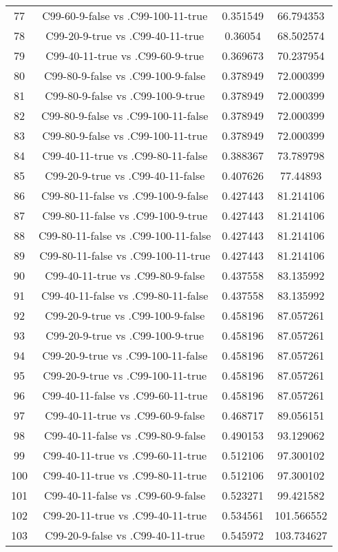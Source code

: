 \documentclass[a4paper,10pt]{article}
\begin{document}
\begin{landscape}
\begin{table}[!htp]
\begin{tabular}{cccc}
77&C99-60-9-false vs .C99-100-11-true&0.351549&66.794353\\
78&C99-20-9-true vs .C99-40-11-true&0.36054&68.502574\\
79&C99-40-11-true vs .C99-60-9-true&0.369673&70.237954\\
80&C99-80-9-false vs .C99-100-9-false&0.378949&72.000399\\
81&C99-80-9-false vs .C99-100-9-true&0.378949&72.000399\\
82&C99-80-9-false vs .C99-100-11-false&0.378949&72.000399\\
83&C99-80-9-false vs .C99-100-11-true&0.378949&72.000399\\
84&C99-40-11-true vs .C99-80-11-false&0.388367&73.789798\\
85&C99-20-9-true vs .C99-40-11-false&0.407626&77.44893\\
86&C99-80-11-false vs .C99-100-9-false&0.427443&81.214106\\
87&C99-80-11-false vs .C99-100-9-true&0.427443&81.214106\\
88&C99-80-11-false vs .C99-100-11-false&0.427443&81.214106\\
89&C99-80-11-false vs .C99-100-11-true&0.427443&81.214106\\
90&C99-40-11-true vs .C99-80-9-false&0.437558&83.135992\\
91&C99-40-11-false vs .C99-80-11-false&0.437558&83.135992\\
92&C99-20-9-true vs .C99-100-9-false&0.458196&87.057261\\
93&C99-20-9-true vs .C99-100-9-true&0.458196&87.057261\\
94&C99-20-9-true vs .C99-100-11-false&0.458196&87.057261\\
95&C99-20-9-true vs .C99-100-11-true&0.458196&87.057261\\
96&C99-40-11-false vs .C99-60-11-true&0.458196&87.057261\\
97&C99-40-11-true vs .C99-60-9-false&0.468717&89.056151\\
98&C99-40-11-false vs .C99-80-9-false&0.490153&93.129062\\
99&C99-40-11-true vs .C99-60-11-true&0.512106&97.300102\\
100&C99-40-11-true vs .C99-80-11-true&0.512106&97.300102\\
101&C99-40-11-false vs .C99-60-9-false&0.523271&99.421582\\
102&C99-20-11-true vs .C99-40-11-true&0.534561&101.566552\\
103&C99-20-9-false vs .C99-40-11-true&0.545972&103.734627\\

\end{tabular}
\end{table}
\end{landscape}
\end{document}
